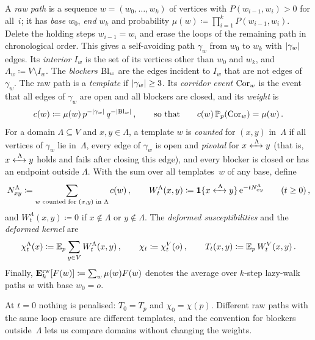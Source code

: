 \begin{definition}\label{def:deformation}
A \emph{raw path} is a sequence $w=(w_0,\dots,w_k)$ of vertices with $P(w_{i-1},w_i)>0$ for all~$i$;
it has \emph{base} $w_0$, \emph{end} $w_k$ and probability $\mu(w)\coloneqq\prod_{i=1}^kP(w_{i-1},w_i)$.
Delete the holding steps $w_{i-1}=w_i$ and erase the loops of the remaining path in chronological
order. This gives a self-avoiding path $\gamma_w$ from $w_0$ to $w_k$ with $\lvert\gamma_w\rvert$ edges. Its
\emph{interior} $I_w$ is the set of its vertices other than $w_0$ and $w_k$, and $\Lambda_w\coloneqq
V\setminus I_w$. The \emph{blockers} $\mathrm{Bl}_w$ are the edges incident to $I_w$ that are not edges
of~$\gamma_w$. The raw path is a \emph{template} if $\lvert\gamma_w\rvert\ge3$. Its \emph{corridor event}
$\mathrm{Cor}_w$ is the event that all edges of $\gamma_w$ are open and all blockers are closed, and its
\emph{weight} is
\begin{equation*}
  c(w)\coloneqq\mu(w)\,p^{-\lvert\gamma_w\rvert}\,q^{-\lvert\mathrm{Bl}_w\rvert}\,,\qquad\text{so that}\qquad
  c(w)\,\mathbb P_p(\mathrm{Cor}_w)=\mu(w)\,.
\end{equation*}
For a domain $\Lambda\subseteq V$ and $x,y\in\Lambda$, a template
$w$ is \emph{counted} for $(x,y)$ in~$\Lambda$ if all vertices of $\gamma_w$ lie in~$\Lambda$, every
edge of $\gamma_w$ is open and \emph{pivotal} for $x\xleftrightarrow{\;\Lambda\;}y$ (that is, $x\xleftrightarrow{\;\Lambda\;}y$
holds and fails after closing this edge), and every blocker is closed or has an endpoint outside
$\Lambda$. With the sum over all templates~$w$ of any base, define
\begin{equation*}
  N^\Lambda_{xy}\coloneqq\sum_{w\text{ counted for }(x,y)\text{ in }\Lambda}c(w)\,,\qquad
  W^\Lambda_t(x,y)\coloneqq\mathbf{1}\{x\xleftrightarrow{\;\Lambda\;}y\}\,\mathrm{e}^{-tN^\Lambda_{xy}}\qquad(t\ge0)\,,
\end{equation*}
and $W^\Lambda_t(x,y)\coloneqq0$ if $x\notin\Lambda$ or $y\notin\Lambda$. The \emph{deformed
susceptibilities} and the \emph{deformed kernel} are
\begin{equation*}
  \chi^\Lambda_t(x)\coloneqq\mathbb E_p\sum_{y\in V}W^\Lambda_t(x,y)\,,\qquad
  \chi_t\coloneqq\chi^V_t(o)\,,\qquad
  T_t(x,y)\coloneqq\mathbb E_p\,W^V_t(x,y)\,.
\end{equation*}
Finally, $\mathbf{E}^{\mathrm{rw}}_{k}[F(w)]\coloneqq\sum_w\mu(w)F(w)$ denotes the average over $k$-step lazy-walk paths $w$ with
base $w_0=o$.
\end{definition}

At $t=0$ nothing is penalised: $T_0=T_p$ and $\chi_0=\chi(p)$. Different raw paths with the same
loop erasure are different templates, and the convention for blockers outside~$\Lambda$ lets us compare
domains without changing the weights.

